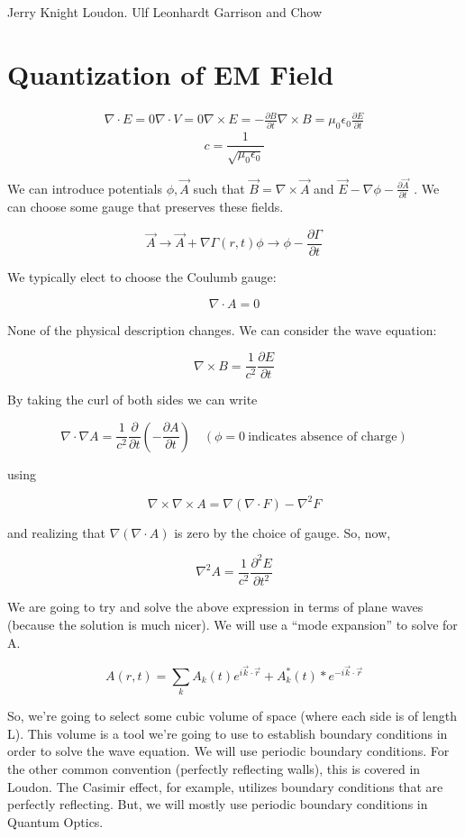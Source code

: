 \documentclass{article}
\begin{document}
Jerry Knight 
Loudon.
Ulf Leonhardt
Garrison and Chow

\section{Quantization of EM Field}
\begin{align}
    \nabla \cdot E = 0
    \nabla \cdot V = 0
    \nabla \times E = - \frac{\partial B}{\partial t}
    \nabla \times B = \mu_0 \epsilon_0 \frac{\partial E}{\partial t}
\end{align}
\[ 
    c = \frac{1}{\sqrt{\mu_0 \epsilon_0}} 
\]

We can introduce potentials $\phi, \vec{A}$ such that $\vec{B} = \nabla \times
\vec{A}$ and $\vec{E} - \nabla \phi - \frac{\partial\vec{A}}{\partial t}$ . We
can choose some gauge that preserves these fields. 

\[ 
\vec{A} \rightarrow \vec{A} + \nabla \Gamma(r,t)
\phi \rightarrow \phi - \frac{\partial \Gamma}{\partial t}
\]

We typically elect to choose
the Coulumb gauge:

\[ 
    \nabla \cdot A = 0 
\]

None of the physical description changes. We can consider the wave equation:

\[ 
    \nabla \times B = \frac{1}{c^2} \frac{\partial E}{\partial t} 
\]

By taking the curl of both sides we can write

\[ 
    \nabla \cdot \nabla A = \frac{1}{c^2} \frac{\partial }{\partial t} \left(
    -\frac{\partial A}{\partial t} \right) \quad(\phi = 0~\text{indicates absence of
    charge})
\]

using

\[ 
    \nabla \times \nabla \times A = \nabla \left( \nabla \cdot F \right) -
    \nabla^2 F
\]

and realizing that $\nabla(\nabla \cdot A)$ is zero by the choice of gauge. So,
now,

\[ 
    \nabla^2 A = \frac{1}{c^2}\frac{\partial^2 E}{\partial t^2}
\]

We are going to try and solve the above expression in terms of plane waves
(because the solution is much nicer). We will use a ``mode expansion'' to solve
for A.

\[ 
    A(r,t) = \sum_k A_k(t)e^{i \vec{k}\cdot \vec{r}} + A_k^*(t)*e^{-i \vec{k}
    \cdot \vec{r}} 
\]


So, we're going to select some cubic volume of space (where each side is of
length L). This volume is a tool we're going to use to establish boundary
conditions in order to solve the wave equation. We will use periodic boundary
conditions. For the other common convention (perfectly reflecting walls), this
is covered in Loudon. The Casimir effect, for example, utilizes boundary
conditions that are perfectly reflecting. But, we will mostly use periodic
boundary conditions in Quantum Optics.
\end{document}
